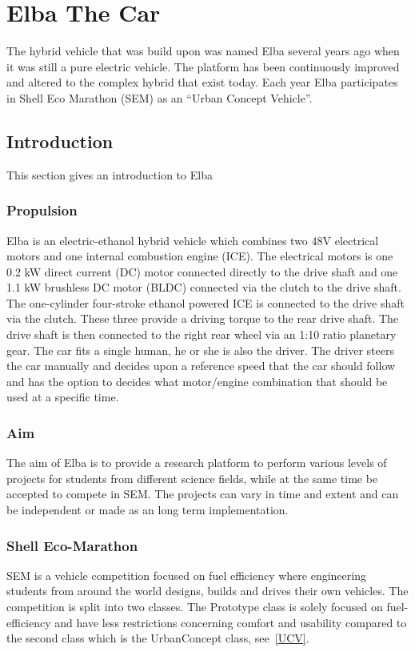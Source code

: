 \chapter{Elba The Car}
The hybrid vehicle that was build upon was named Elba several years ago when it
was still a pure electric vehicle. The platform has been continuously improved
and altered to the complex hybrid that exist today. Each year Elba participates
in Shell Eco Marathon (SEM) as an ``Urban Concept Vehicle''.

\section{Introduction}
This section gives an introduction to Elba
\subsection{Propulsion}
Elba is an electric-ethanol hybrid vehicle which combines two 48V electrical
motors and one internal combustion engine (ICE). The electrical motors is one
0.2 kW direct current (DC) motor connected directly to the drive shaft and one
1.1 kW brushless DC motor (BLDC) connected via the clutch to the drive shaft.
The one-cylinder four-stroke ethanol powered ICE is connected to the drive
shaft via the clutch. These three provide a driving torque to the rear drive
shaft. The drive shaft is then connected to the right rear wheel via an 1:10
ratio planetary gear. The car fits a single human, he or she is also the
driver. The driver steers the car manually and decides upon a reference speed
that the car should follow and has the option to decides what motor/engine
combination that should be used at a specific time.

\subsection{Aim}
The aim of Elba is to provide a research platform to perform various levels of
projects for students from different science fields, while at the same time be
accepted to compete in SEM\@. The projects can vary in time and
extent and can be independent or made as an long term implementation. 

\subsection{Shell Eco-Marathon}
SEM is a vehicle competition focused on fuel efficiency where engineering
students from around the world designs, builds and drives their own vehicles.
The competition is split into two classes. The Prototype class is solely
focused on fuel-efficiency and have less restrictions concerning comfort and
usability compared to the second class which is the UrbanConcept class,
see~\ref{UCV}.

